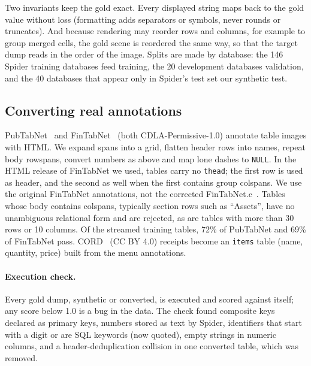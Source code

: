 \documentclass[10pt,twocolumn]{article}
\begin{document}
Two invariants keep the gold exact. Every displayed string maps back to the gold value without loss (formatting
adds separators or symbols, never rounds or truncates). And because rendering may reorder rows and columns, for
example to group merged cells, the gold scene is reordered the same way, so that the target dump reads in the
order of the image. Splits are made by database: the 146 Spider training databases feed training, the 20
development databases validation, and the 40 databases that appear only in Spider's test set our synthetic test.

\subsection{Converting real annotations}
PubTabNet~\citep{zhong2020pubtabnet} and FinTabNet~\citep{zheng2021gte} (both CDLA-Permissive-1.0) annotate table
images with HTML. We expand spans into a grid, flatten header rows into names, repeat body rowspans, convert numbers
as above and map lone dashes to \texttt{NULL}. In the HTML release of FinTabNet we used, tables carry no
\texttt{thead}; the first row is used as header, and the second as well when the first contains group colspans.
We use the original FinTabNet annotations, not the corrected FinTabNet.c~\citep{smock2023aligning}. Tables whose body contains colspans, typically section rows such as
``Assets'', have no unambiguous relational form and are rejected, as are tables with more than 30 rows or 10
columns. Of the streamed training tables, 72\% of PubTabNet and 69\% of FinTabNet pass. CORD~\citep{park2019cord}
(CC BY 4.0) receipts become an \texttt{items} table (name, quantity, price) built from the menu annotations.

\paragraph{Execution check.} Every gold dump, synthetic or converted, is executed and scored against itself; any
score below 1.0 is a bug in the data. The check found composite keys declared as primary keys, numbers stored as
text by Spider, identifiers that start with a digit or are SQL keywords (now quoted), empty strings in numeric
columns, and a header-deduplication collision in one converted table, which was removed.

\begin{table}[t]
\centering\small
\setlength{\tabcolsep}{4pt}

\caption{Splits. Rows and columns are averages per table; ``with FK'' is the share of images whose gold contains a
foreign key. All splits are released.}
\label{tab:data}
\end{table}
\end{document}
